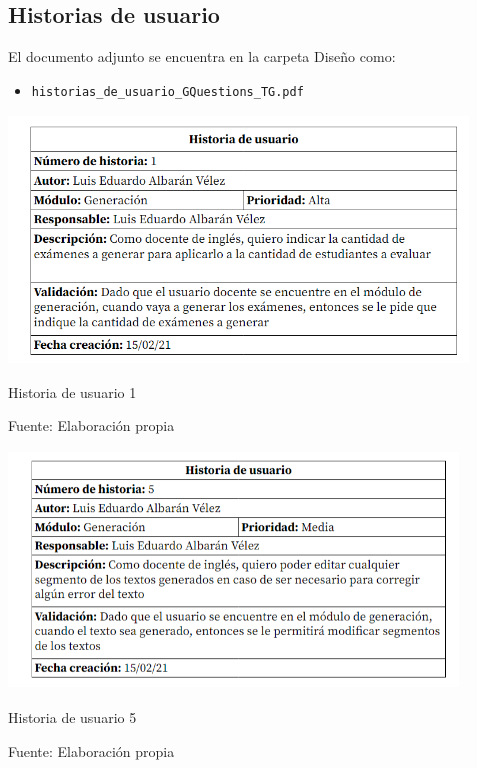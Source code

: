 \documentclass[../Main.tex]{subfiles}
\begin{document}
\thispagestyle{empty} %

\subsection*{Historias de usuario}
\begin{justify}
El documento adjunto se encuentra en la carpeta Diseño como:
\begin{itemize}
    \item \texttt{historias\_de\_usuario\_GQuestions\_TG.pdf}
\end{itemize}
\end{justify}

    \begin{table}[H]
	\begin{Center}
		\includegraphics[width=4.8in,height=2.6in]{./images/hu_1}
	    \caption{Historia de usuario 1}
	    Fuente: Elaboración propia
        \label{tab:section}
	\end{Center}
    \end{table}

    \begin{table}[H]
	\begin{Center}
		\includegraphics[width=4.7in,height=2.5in]{./images/hu_5}
	    \caption{Historia de usuario 5}
	    Fuente: Elaboración propia
        \label{tab:section}
	\end{Center}
    \end{table}
  
\end{document}

